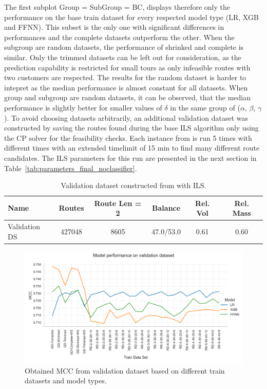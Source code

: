 The first subplot Group = SubGroup = BC, displays therefore only the performance on the base train dataset for every respected model type (\gls{LR}, XGB and \gls{FFNN}).
This subset is the only one with significant differences in performances and the complete datasets outperform the other. When the subgroup
are random datasets, the performance of shrinked and complete is similar. Only the trimmed datasets can be left out for consideration, as
the prediction capability is restricted for small tours as only infeasible routes with two customers are respected. The results for the random
dataset is harder to intepret as the median performance is almost constant for all datasets. When group and subgroup are random datasets, it can
be observed, that the median performance is slightly better for smaller values of $\delta$ in the same group of ($\alpha$, $\beta$, $\gamma$).
To avoid choosing datasets arbitrarily, an additional validation dataset was constructed by saving the routes found during the base \gls{ILS}
algorithm only using the \gls{CP} solver for the feasibility checks. Each instance from \gendreauDataSetText is run 5 times with different times
with an extended timelimit of 15 min to find many different route candidates. The \gls{ILS} parameters for this run are presented in the next section
in Table~\ref{tab:parameters_final_noclassifier}.

\begin{table}[!h]
    \centering
    \small
    \begin{tabular}{l c c c c c }
        \toprule
        Name          & Routes & Route Len = 2 & Balance   & Rel. Vol & Rel. Mass \\
        \midrule
        Validation DS & 427048 & 8605          & 47.0/53.0 & 0.61     & 0.60      \\
        \bottomrule
    \end{tabular}
    \caption{Validation dataset constructed from \gendreauDataSet with ILS.}
    \label{tab:validation_dataset_gendreau}
\end{table}

\begin{figure}[ht]
    \centering
    \includegraphics[width =\textwidth]{pictures/feature_filter/validation_line_plot.png}
    \caption{Obtained MCC from validation dataset based on different train datasets and model types.}
    \label{fig:validation_performance_line_plot}
\end{figure}


